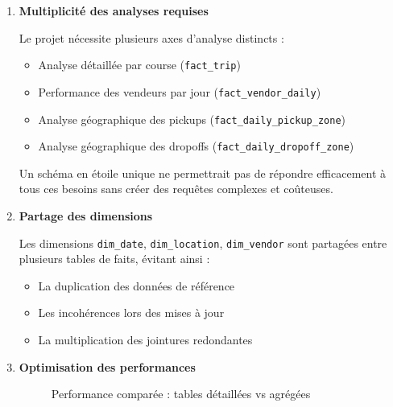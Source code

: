 \documentclass[12pt,a4paper]{report}
\begin{document}
\begin{enumerate}
    \item \textbf{Multiplicité des analyses requises}

    Le projet nécessite plusieurs axes d'analyse distincts :
    \begin{itemize}
        \item Analyse détaillée par course (\texttt{fact\_trip})
        \item Performance des vendeurs par jour (\texttt{fact\_vendor\_daily})
        \item Analyse géographique des pickups (\texttt{fact\_daily\_pickup\_zone})
        \item Analyse géographique des dropoffs (\texttt{fact\_daily\_dropoff\_zone})
    \end{itemize}

    Un schéma en étoile unique ne permettrait pas de répondre efficacement à tous ces besoins sans créer des requêtes complexes et coûteuses.

    \item \textbf{Partage des dimensions}

    Les dimensions \texttt{dim\_date}, \texttt{dim\_location}, \texttt{dim\_vendor} sont partagées entre plusieurs tables de faits, évitant ainsi :
    \begin{itemize}
        \item La duplication des données de référence
        \item Les incohérences lors des mises à jour
        \item La multiplication des jointures redondantes
    \end{itemize}

    \item \textbf{Optimisation des performances}

    \begin{figure}[H]
    \centering
    \caption{Performance comparée : tables détaillées vs agrégées}
    \end{figure}


\end{enumerate}
\end{document}
